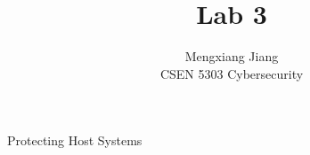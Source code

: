 \documentclass[12pt]{article}
\newenvironment{problem}[2][Problem]{\begin{trivlist}
\item[\hskip \labelsep {\bfseries #1}\hskip \labelsep {\bfseries #2.}]}{\end{trivlist}}
\begin{document}
 
 
\title{Lab 3}%
\author{Mengxiang Jiang\\ %
CSEN 5303 Cybersecurity} %
 
\maketitle
 
\begin{problem}{1} %
    Protecting Host Systems 


\end{problem}
\end{document}
